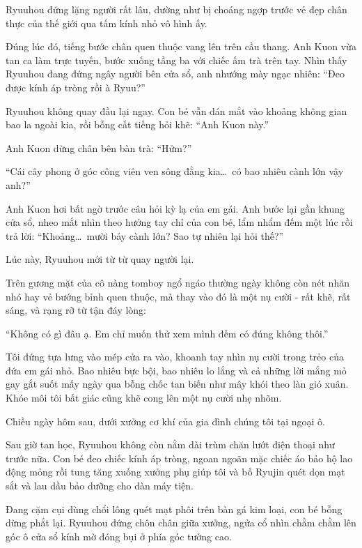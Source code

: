 ﻿\documentclass[../main.tex]{subfiles}
\begin{document}
Ryuuhou đứng lặng người rất lâu, dường như bị choáng ngợp trước vẻ đẹp chân thực của thế giới qua tấm kính nhỏ vô hình ấy.

Đúng lúc đó, tiếng bước chân quen thuộc vang lên trên cầu thang. Anh Kuon vừa tan ca làm trực tuyến, bước xuống tầng ba với chiếc ấm trà trên tay. Nhìn thấy Ryuuhou đang đứng ngây người bên cửa sổ, anh nhướng mày ngạc nhiên: ``Đeo được kính áp tròng rồi à Ryuu?''

Ryuuhou không quay đầu lại ngay. Con bé vẫn dán mắt vào khoảng không gian bao la ngoài kia, rồi bỗng cất tiếng hỏi khẽ: ``Anh Kuon này.''

Anh Kuon dừng chân bên bàn trà: ``Hửm?''

``Cái cây phong ở góc công viên ven sông đằng kia\dots\ có bao nhiêu cành lớn vậy anh?''

Anh Kuon hơi bất ngờ trước câu hỏi kỳ lạ của em gái. Anh bước lại gần khung cửa sổ, nheo mắt nhìn theo hướng tay chỉ của con bé, lẩm nhẩm đếm một lúc rồi trả lời: ``Khoảng\dots\ mười bảy cành lớn? Sao tự nhiên lại hỏi thế?''

Lúc này, Ryuuhou mới từ từ quay người lại.

Trên gương mặt của cô nàng tomboy ngổ ngáo thường ngày không còn nét nhăn nhó hay vẻ bướng bỉnh quen thuộc, mà thay vào đó là một nụ cười -  rất khẽ, rất sáng, và rạng rỡ từ tận đáy lòng:

``Không có gì đâu ạ. Em chỉ muốn thử xem mình đếm có đúng không thôi.''

Tôi đứng tựa lưng vào mép cửa ra vào, khoanh tay nhìn nụ cười trong trẻo của đứa em gái nhỏ. Bao nhiêu bực bội, bao nhiêu lo lắng và cả những lời mắng mỏ gay gắt suốt mấy ngày qua bỗng chốc tan biến như mây khói theo làn gió xuân. Khóe môi tôi bất giác cũng khẽ cong lên một nụ cười nhẹ nhõm.

\omk

Chiều ngày hôm sau, dưới xưởng cơ khí của gia đình chúng tôi tại ngoại ô.

Sau giờ tan học, Ryuuhou không còn nằm dài trùm chăn lướt điện thoại như trước nữa. Con bé đeo chiếc kính áp tròng, ngoan ngoãn mặc chiếc áo bảo hộ lao động mỏng rồi tung tăng xuống xưởng phụ giúp tôi và bố Ryujin quét dọn mạt sắt và lau dầu bảo dưỡng cho dàn máy tiện.

Đang cặm cụi dùng chổi lông quét mạt phôi trên bàn gá kim loại, con bé bỗng dừng phắt lại. Ryuuhou đứng chôn chân giữa xưởng, ngửa cổ nhìn chằm chằm lên góc ô cửa sổ kính mờ đóng bụi ở phía góc tường cao.
\end{document}
